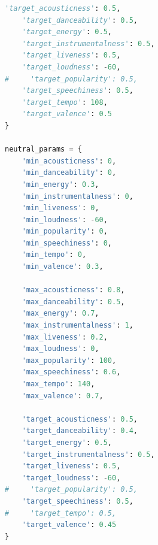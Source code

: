\documentclass{article}
\renewcommand{\_}[1]{\underline{ #1 }}
\theoremstyle{definition}
\begin{document}
\begin{lstlisting}[language=Python]
    'target_acousticness': 0.5,
    'target_danceability': 0.5,
    'target_energy': 0.5,
    'target_instrumentalness': 0.5,
    'target_liveness': 0.5,
    'target_loudness': -60,
#     'target_popularity': 0.5,
    'target_speechiness': 0.5,
    'target_tempo': 108,
    'target_valence': 0.5    
}

neutral_params = {
    'min_acousticness': 0,
    'min_danceability': 0,
    'min_energy': 0.3,
    'min_instrumentalness': 0,
    'min_liveness': 0,
    'min_loudness': -60,
    'min_popularity': 0,
    'min_speechiness': 0,
    'min_tempo': 0,
    'min_valence': 0.3,
    
    'max_acousticness': 0.8,
    'max_danceability': 0.5,
    'max_energy': 0.7,
    'max_instrumentalness': 1,
    'max_liveness': 0.2,
    'max_loudness': 0,
    'max_popularity': 100,
    'max_speechiness': 0.6,
    'max_tempo': 140,
    'max_valence': 0.7,
    
    'target_acousticness': 0.5,
    'target_danceability': 0.4,
    'target_energy': 0.5,
    'target_instrumentalness': 0.5,
    'target_liveness': 0.5,
    'target_loudness': -60,
#     'target_popularity': 0.5,
    'target_speechiness': 0.5,
#     'target_tempo': 0.5,
    'target_valence': 0.45    
}

\end{lstlisting}
\end{document}
